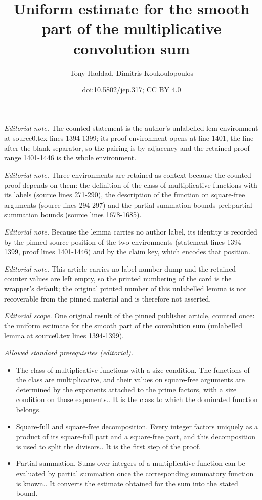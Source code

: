 \documentclass[10pt,a4paper]{article}
\title{Uniform estimate for the smooth part of the multiplicative convolution sum}
\author{Tony Haddad, Dimitris Koukoulopoulos}
\date{doi:10.5802/jep.317; CC BY 4.0}
\theoremstyle{plain}
\theoremstyle{definition}
\begin{document}
\maketitle
\noindent\textit{Editorial note.} The counted statement is the author's unlabelled lem environment at source0.tex lines 1394-1399; its proof environment opens at line 1401, the line after the blank separator, so the pairing is by adjacency and the retained proof range 1401-1446 is the whole environment.\par\medskip
\noindent\textit{Editorial note.} Three environments are retained as context because the counted proof depends on them: the definition of the class of multiplicative functions with its labels (source lines 271-290), the description of the function on square-free arguments (source lines 294-297) and the partial summation bounds prel:partial summation bounds (source lines 1678-1685).\par\medskip
\noindent\textit{Editorial note.} Because the lemma carries no author label, its identity is recorded by the pinned source position of the two environments (statement lines 1394-1399, proof lines 1401-1446) and by the claim key, which encodes that position.\par\medskip
\noindent\textit{Editorial note.} This article carries no label-number dump and the retained counter values are left empty, so the printed numbering of the card is the wrapper's default; the original printed number of this unlabelled lemma is not recoverable from the pinned material and is therefore not asserted.\par\medskip
\noindent\textit{Editorial scope.} One original result of the pinned publisher article, counted once: the uniform estimate for the smooth part of the convolution sum (unlabelled lemma at source0.tex lines 1394-1399).\par\medskip
\noindent\textit{Allowed standard prerequisites (editorial).}\begin{itemize}
\item The class of multiplicative functions with a size condition. The functions of the class are multiplicative, and their values on square-free arguments are determined by the exponents attached to the prime factors, with a size condition on those exponents.. It is the class to which the dominated function belongs.
\item Square-full and square-free decomposition. Every integer factors uniquely as a product of its square-full part and a square-free part, and this decomposition is used to split the divisors.. It is the first step of the proof.
\item Partial summation. Sums over integers of a multiplicative function can be evaluated by partial summation once the corresponding summatory function is known.. It converts the estimate obtained for the sum into the stated bound.
\end{itemize}\medskip
\end{document}
